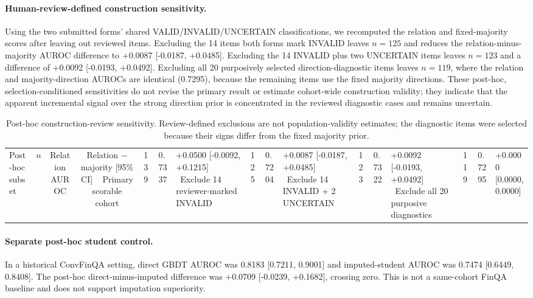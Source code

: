 \documentclass[11pt]{article}
\begin{document}
\paragraph{Human-review-defined construction sensitivity.} Using the two submitted forms' shared VALID/INVALID/UNCERTAIN classifications, we recomputed the relation and fixed-majority scores after leaving out reviewed items. Excluding the 14 items both forms mark INVALID leaves $n=125$ and reduces the relation-minus-majority AUROC difference to +0.0087 [-0.0187, +0.0485]. Excluding the 14 INVALID plus two UNCERTAIN items leaves $n=123$ and a difference of +0.0092 [-0.0193, +0.0492]. Excluding all 20 purposively selected direction-diagnostic items leaves $n=119$, where the relation and majority-direction AUROCs are identical (0.7295), because the remaining items use the fixed majority directions. These post-hoc, selection-conditioned sensitivities do not revise the primary result or estimate cohort-wide construction validity; they indicate that the apparent incremental signal over the strong direction prior is concentrated in the reviewed diagnostic cases and remains uncertain.

\begin{table}[t]
\centering\small
\begin{tabularx}{\columnwidth}{@{}Xrcc@{}}
\toprule
Post-hoc subset & $n$ & Relation AUROC & Relation $-$ majority [95\% CI] \
\midrule
Primary scorable cohort & 139 & 0.7337 & +0.0500 [-0.0092, +0.1215] \
Exclude 14 reviewer-marked INVALID & 125 & 0.7204 & +0.0087 [-0.0187, +0.0485] \
Exclude 14 INVALID + 2 UNCERTAIN & 123 & 0.7322 & +0.0092 [-0.0193, +0.0492] \
Exclude all 20 purposive diagnostics & 119 & 0.7295 & +0.0000 [0.0000, 0.0000] \
\bottomrule
\end{tabularx}
\caption{Post-hoc construction-review sensitivity. Review-defined exclusions are not population-validity estimates; the diagnostic items were selected because their signs differ from the fixed majority prior.}
\label{tab:human-review-sensitivity}
\end{table}

\paragraph{Separate post-hoc student control.} In a historical ConvFinQA setting, direct GBDT AUROC was 0.8183 [0.7211, 0.9001] and imputed-student AUROC was 0.7474 [0.6449, 0.8408]. The post-hoc direct-minus-imputed difference was +0.0709 [-0.0239, +0.1682], crossing zero. This is not a same-cohort FinQA baseline and does not support imputation superiority.
\end{document}
